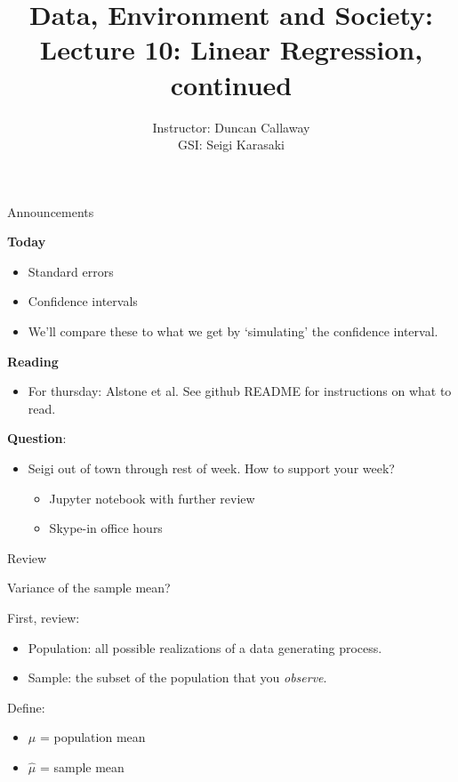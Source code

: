 \documentclass[aspectratio=169]{beamer}
\title[Lecture 10: Regression, continued] %
{Data, Environment and Society: \\{Lecture 10: Linear Regression, continued}}
\author[ER190C: Data, Environment and Society] 
{Instructor: Duncan Callaway\\
GSI: Seigi Karasaki}
\institute[UC Berkeley] %
 {\small{ \bf September 25, 2018}}
\date[September 25, 2018]
\begin{document}
\begin{frame}
  \titlepage
\end{frame}

\begin{frame}{Announcements}

\textbf{Today}
\begin{itemize}
\item Standard errors
\item Confidence intervals 
\item We'll compare these to what we get by `simulating' the confidence interval.
\end{itemize}

\textbf{Reading}
\begin{itemize}
\item For thursday: Alstone et al.  See github README for instructions on what to read.
\end{itemize}

\textbf{Question}:
\begin{itemize}
\item Seigi out of town through rest of week.  How to support your week?
\begin{itemize}
\item Jupyter notebook with further review 
\item Skype-in office hours
\end{itemize}
\end{itemize}

\end{frame}


\begin{frame}{Review}

\end{frame}

\begin{frame}{Variance of the sample mean?}

First, review:
\begin{itemize}
\item Population: all possible realizations of a data generating process.  
\item Sample: the subset of the population that you \textit{observe}.  
\end{itemize}

Define:
\begin{itemize}
\item $\mu$ = population mean
\item $\hat{\mu}$ = sample mean
\end{itemize}

\end{frame}
\end{document}
